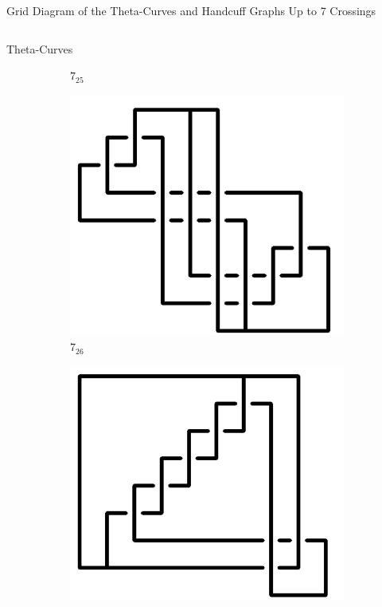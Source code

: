 \documentclass[final]{beamer}
\begin{document}
\begin{frame}[t]
\begin{alertblock}{Grid Diagram of the Theta-Curves and Handcuff Graphs Up to 7 Crossings}
\begin{columns}[t]
\begin{column}{0.5\textwidth}
\begin{alertblock}{Theta-Curves}
\begin{figure}
\begin{subfigure}{0.075\textwidth}
    \caption{$7_{25}$} 
    \end{subfigure}
    \begin{subfigure}{0.075\textwidth}
    \includegraphics[width=\columnwidth]{../Midterm_Poster/grid_diagram/theta_7_26.png}
    \caption{$7_{26}$} 
    \end{subfigure}
    \begin{subfigure}{0.075\textwidth}
    \includegraphics[width=\columnwidth]{../Midterm_Poster/grid_diagram/theta_7_27.png}

\end{subfigure}
\end{figure}
\end{alertblock}
\end{column}
\end{columns}
\end{alertblock}
\end{frame}
\end{document}
